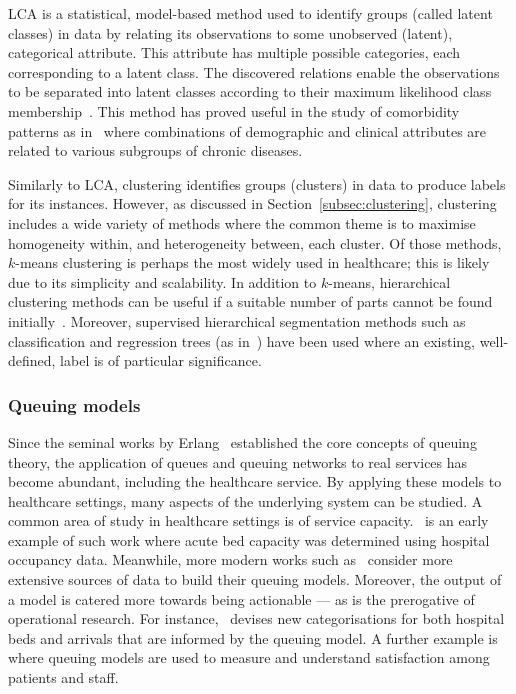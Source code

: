 LCA is a statistical, model-based method used to identify groups (called latent
classes) in data by relating its observations to some unobserved (latent),
categorical attribute. This attribute has multiple possible categories, each
corresponding to a latent class. The discovered relations enable the
observations to be separated into latent classes according to their maximum
likelihood class membership~\cite{Hagenaars2002,Lazarsfeld1968}. This method has
proved useful in the study of comorbidity patterns as
in~\cite{Kuwornu2014,Larsen2017} where combinations of demographic and clinical
attributes are related to various subgroups of chronic diseases.

Similarly to LCA, clustering identifies groups (clusters) in data to produce
labels for its instances. However, as discussed in
Section~\ref{subsec:clustering}, clustering includes a wide variety of methods
where the common theme is to maximise homogeneity within, and heterogeneity
between, each cluster. Of those methods, \(k\)-means clustering is perhaps the
most widely used in healthcare; this is likely due to its simplicity and
scalability. In addition to \(k\)-means, hierarchical clustering methods can be
useful if a suitable number of parts cannot be found initially~\cite{Vuik2016a}.
Moreover, supervised hierarchical segmentation methods such as classification
and regression trees (as in~\cite{Harper2006}) have been used where an existing,
well-defined, label is of particular significance.

\subsubsection{Queuing models}

Since the seminal works by Erlang~\cite{Erlang1917,Erlang1920} established the
core concepts of queuing theory, the application of queues and queuing networks
to real services has become abundant, including the healthcare service. By
applying these models to healthcare settings, many aspects of the underlying
system can be studied. A common area of study in healthcare settings is of
service capacity.~\cite{McClain1976} is an early example of such work where
acute bed capacity was determined using hospital occupancy data. Meanwhile, more
modern works such as~\cite{Palvannan2012,Pinto2014} consider more extensive
sources of data to build their queuing models.  Moreover, the output of a model
is catered more towards being actionable --- as is the prerogative of
operational research. For instance,~\cite{Pinto2014} devises new categorisations
for both hospital beds and arrivals that are informed by the queuing model. A
further example is~\cite{Komashie2015} where queuing models are used to measure
and understand satisfaction among patients and staff.


